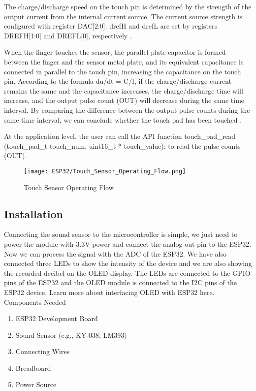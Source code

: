 The charge/discharge speed on the touch pin is determined by the strength of the output current from the internal current source. The current source strength is configured with register DAC[2:0]. drefH and drefL are set by registers DREFH[1:0] and DREFL[0], respectively \cite{Azzam:2021}.

When the finger touches the sensor, the parallel plate capacitor is formed between the finger and the sensor metal plate, and its equivalent capacitance is connected in parallel to the touch pin, increasing the capacitance on the touch pin. According to the formula du/dt = C/I, if the charge/discharge current remains the same and the capacitance increases, the charge/discharge time will increase, and the output pulse count (OUT) will decrease during the same time interval. By comparing the difference between the output pulse counts during the same time interval, we can conclude whether the touch pad has been touched \cite{Arif:2023}.

At the application level, the user can call the API function touch_pad_read (touch_pad_t touch_num, uint16_t * touch_value); to read the pulse counts (OUT).

\begin{figure}  
	\begin{center}
		\texttt{[image: ESP32/Touch\_Sensor\_Operating\_Flow.png]}
		\caption{Touch Sensor Operating Flow} 
		\label{fig:Python 3.10.}
	\end{center}
\end{figure}	

\subsection{Installation}
Connecting the sound sensor to the microcontroller is simple, we just need to power the module with 3.3V power and connect the analog out pin to the ESP32. Now we can process the signal with the ADC of the ESP32. We have also connected three LEDs to show the intensity of the device and we are also showing the recorded decibel on the OLED display. The LEDs are connected to the GPIO pins of the ESP32 and the OLED module is connected to the I2C pins of the ESP32 device. Learn more about interfacing OLED with ESP32 here.
\\

Components Needed

\begin{enumerate}
	\item ESP32 Development Board
	\item Sound Sensor (e.g., KY-038, LM393)
	\item Connecting Wires
	\item Breadboard 
	\item Power Source  
\end{enumerate}

